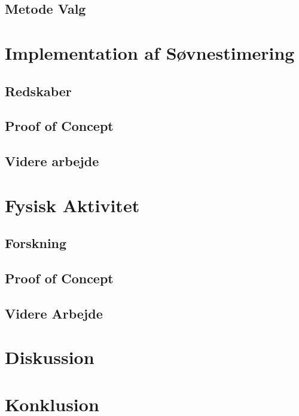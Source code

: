 \section{Metode Valg}\label{sec:metodevalg}



\chapter{Implementation af Søvnestimering}

\section{Redskaber}\label{sec:redskaber}

\section{Proof of Concept}


\label{sec:verisoevn}
\section{Videre arbejde}\label{sec:videre-arbejde}









\chapter{Fysisk Aktivitet}

\section{Forskning}

\section{Proof of Concept}

\section{Videre Arbejde}\label{sec:videre-arbejde-fa}


\chapter{Diskussion}\label{chap:bigdisc}


\chapter{Konklusion}




\label{bib:mybiblio}

\appendix

